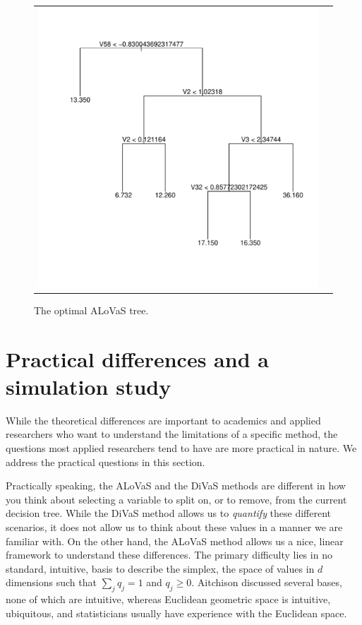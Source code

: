\begin{figure}
\begin{center} 
\begin{tabular}{cc}
\includegraphics[scale=0.25]{figures/lasso_compare_tree.pdf}
\end{tabular}
\caption{The optimal ALoVaS tree.}
\label{fig:chain_max_interaction_tree}
\end{center}
\end{figure} 

\section{Practical differences and a simulation study}

While the theoretical differences are important to academics and applied researchers who want to understand the limitations of a specific method, the questions most applied researchers tend to have are more practical in nature. We address the practical questions in this section. 

Practically speaking, the ALoVaS and the DiVaS methods are different in how you think about selecting a variable to split on, or to remove, from the current decision tree. While the DiVaS method allows us to \emph{quantify} these different scenarios, it does not allow us to think about these values in a manner we are familiar with. On the other hand, the ALoVaS method allows us a nice, linear framework to understand these differences. The primary difficulty lies in no standard, intuitive, basis to describe the simplex, the space of values in $d$ dimensions such that $\sum_jq_j=1$ and $q_j \geq 0$. Aitchison \cite{aitchison1986statistical} discussed several bases, none of which are intuitive, whereas Euclidean geometric space is intuitive, ubiquitous, and statisticians usually have experience with the Euclidean space.   

